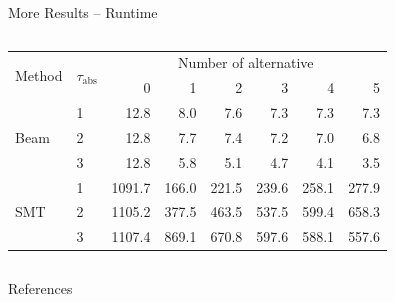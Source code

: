 \documentclass[en, navbaroff]{sdqbeamer}
\begin{document}
\begin{frame}[t]{More Results -- Runtime}
\begin{columns}[T]
\begin{column}{\kitthreecolumns}
\begin{table}[t]
{					%
				}
				\begin{tabular}{llrrrrrr}
					\toprule
					\multirow{2}{*}{Method} & \multirow{2}{*}{$\tau_{\text{abs}}$} & \multicolumn{6}{c}{Number of alternative} \\
					\cmidrule(lr){3-8}
					& & 0 & 1 & 2 & 3 & 4 & 5 \\
					\midrule
					\multirow[t]{3}{*}{Beam} & 1 & 12.8 & 8.0 & 7.6 & 7.3 & 7.3 & 7.3 \\
					& 2 & 12.8 & 7.7 & 7.4 & 7.2 & 7.0 & 6.8 \\
					& 3 & 12.8 & 5.8 & 5.1 & 4.7 & 4.1 & 3.5 \\
					\multirow[t]{3}{*}{SMT} & 1 & 1091.7 & 166.0 & 221.5 & 239.6 & 258.1 & 277.9 \\
					& 2 & 1105.2 & 377.5 & 463.5 & 537.5 & 599.4 & 658.3 \\
					& 3 & 1107.4 & 869.1 & 670.8 & 597.6 & 588.1 & 557.6 \\
					\bottomrule
				\end{tabular}
				\label{tab:csd:alteratives-runtime}
			\end{table}
		\end{column}
	\end{columns}
\end{frame}

\begin{frame}[t, allowframebreaks]{References}
	\printbibliography
\end{frame}

\backupend
\end{document}

